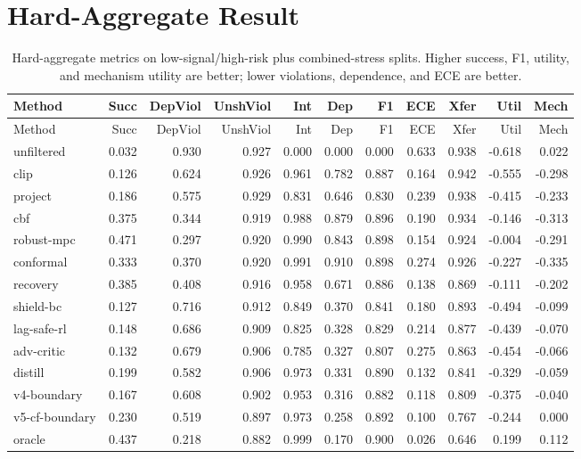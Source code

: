 \documentclass{article}
\begin{document}
\section{Hard-Aggregate Result}

\begingroup
\scriptsize
\begin{longtable}{@{}lrrrrrrrrrr@{}}
\caption{Hard-aggregate metrics on low-signal/high-risk plus combined-stress splits. Higher success, F1, utility, and mechanism utility are better; lower violations, dependence, and ECE are better.}\\
\toprule
Method & Succ & DepViol & UnshViol & Int & Dep & F1 & ECE & Xfer & Util & Mech \\
\midrule
\endfirsthead
\toprule
Method & Succ & DepViol & UnshViol & Int & Dep & F1 & ECE & Xfer & Util & Mech \\
\midrule
\endhead
unfiltered & 0.032 & 0.930 & 0.927 & 0.000 & 0.000 & 0.000 & 0.633 & 0.938 & -0.618 & 0.022 \\
clip & 0.126 & 0.624 & 0.926 & 0.961 & 0.782 & 0.887 & 0.164 & 0.942 & -0.555 & -0.298 \\
project & 0.186 & 0.575 & 0.929 & 0.831 & 0.646 & 0.830 & 0.239 & 0.938 & -0.415 & -0.233 \\
cbf & 0.375 & 0.344 & 0.919 & 0.988 & 0.879 & 0.896 & 0.190 & 0.934 & -0.146 & -0.313 \\
robust-mpc & 0.471 & 0.297 & 0.920 & 0.990 & 0.843 & 0.898 & 0.154 & 0.924 & -0.004 & -0.291 \\
conformal & 0.333 & 0.370 & 0.920 & 0.991 & 0.910 & 0.898 & 0.274 & 0.926 & -0.227 & -0.335 \\
recovery & 0.385 & 0.408 & 0.916 & 0.958 & 0.671 & 0.886 & 0.138 & 0.869 & -0.111 & -0.202 \\
shield-bc & 0.127 & 0.716 & 0.912 & 0.849 & 0.370 & 0.841 & 0.180 & 0.893 & -0.494 & -0.099 \\
lag-safe-rl & 0.148 & 0.686 & 0.909 & 0.825 & 0.328 & 0.829 & 0.214 & 0.877 & -0.439 & -0.070 \\
adv-critic & 0.132 & 0.679 & 0.906 & 0.785 & 0.327 & 0.807 & 0.275 & 0.863 & -0.454 & -0.066 \\
distill & 0.199 & 0.582 & 0.906 & 0.973 & 0.331 & 0.890 & 0.132 & 0.841 & -0.329 & -0.059 \\
v4-boundary & 0.167 & 0.608 & 0.902 & 0.953 & 0.316 & 0.882 & 0.118 & 0.809 & -0.375 & -0.040 \\
v5-cf-boundary & 0.230 & 0.519 & 0.897 & 0.973 & 0.258 & 0.892 & 0.100 & 0.767 & -0.244 & 0.000 \\
oracle & 0.437 & 0.218 & 0.882 & 0.999 & 0.170 & 0.900 & 0.026 & 0.646 & 0.199 & 0.112 \\
\bottomrule
\end{longtable}
\endgroup
\end{document}
